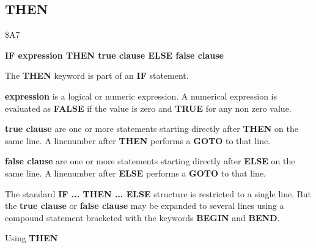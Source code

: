 \subsection{THEN}
\begin{description}[leftmargin=3cm,style=nextline]
\item [Token:] \$A7
\item [Format:] {\bf IF expression THEN true clause ELSE false clause}
\item [Usage:] The {\bf THEN} keyword is part of an {\bf IF}
               statement.

               {\bf expression} is a logical or numeric expression.
               A numerical expression is evaluated as {\bf FALSE}
               if the value is zero and {\bf TRUE} for any non zero
               value.

               {\bf true clause} are one or more statements starting
               directly after {\bf THEN} on the same line.
               A linenumber after {\bf THEN} performs a
               {\bf GOTO} to that line.

               {\bf false clause} are one or more statements starting
               directly after {\bf ELSE} on the same line.
               A linenumber after {\bf ELSE} performs a
               {\bf GOTO} to that line.

\item [Remarks:]
               The standard {\bf IF ... THEN ... ELSE} structure
               is restricted to a single line. But the {\bf true clause}
               or {\bf false clause} may be expanded to several lines
               using a compound statement bracketed with the keywords
               {\bf BEGIN} and {\bf BEND}.
\item [Example:]
                Using {\bf THEN}
\end{description}


\newpage
